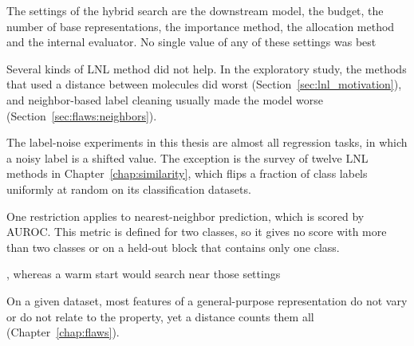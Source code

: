 
The settings of the hybrid search are the downstream model, the budget, the number of base representations, the importance method, the allocation method and the internal evaluator. No single value of any of these settings was best

Several kinds of LNL method did not help. In the exploratory study, the methods that used a distance between molecules did worst (Section~\ref{sec:lnl_motivation}), and neighbor-based label cleaning usually made the model worse (Section~\ref{sec:flaws:neighbors}).

The label-noise experiments in this thesis are almost all regression tasks, in which a noisy label is a shifted value. The exception is the survey of twelve LNL methods in Chapter~\ref{chap:similarity}, which flips a fraction of class labels uniformly at random on its classification datasets.

One restriction applies to nearest-neighbor prediction, which is scored by AUROC. This metric is defined for two classes, so it gives no score with more than two classes or on a held-out block that contains only one class.

, whereas a warm start would search near those settings

On a given dataset, most features of a general-purpose representation do not vary or do not relate to the property, yet a distance counts them all (Chapter~\ref{chap:flaws}).
